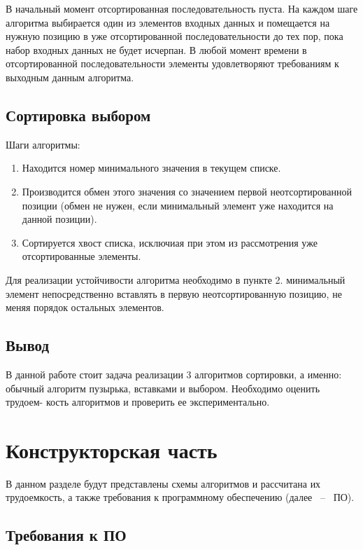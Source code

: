 \documentclass[14pt,russian]{scrartcl}
\begin{document}
В начальный момент отсортированная последовательность пуста. На каждом шаге алгоритма выбирается один из элементов входных данных и помещается на нужную позицию в уже отсортированной последовательности до тех пор, пока набор входных данных не будет исчерпан. В любой момент времени в отсортированной последовательности элементы удовлетворяют требованиям к выходным данным алгоритма.

\subsection{Сортировка выбором}

Шаги алгоритмы:

\begin{enumerate}
    \item Находится номер минимального значения в текущем списке.
    \item Производится обмен этого значения со значением первой неотсортированной позиции (обмен не нужен, если минимальный элемент уже находится на данной позиции).
    \item Сортируется хвост списка, исключиая при этом из рассмотрения уже отсортированные элементы.
\end{enumerate}

Для реализации устойчивости алгоритма необходимо в пункте 2. минимальный элемент непосредственно вставлять в первую неотсортированную позицию, не меняя порядок остальных элементов.

\subsection*{Вывод}

В данной работе стоит задача реализации 3 алгоритмов сортировки, а именно: обычный алгоритм пузырька, вставками и выбором. Необходимо оценить трудоем- кость алгоритмов и проверить ее экспериментально.

\section{Конструкторская часть}

В данном разделе будут представлены схемы алгоритмов и рассчитана их трудоемкость, а также требования к программному обеспечению (далее ~--~ ПО).

\subsection{Требования к ПО}
\end{document}
